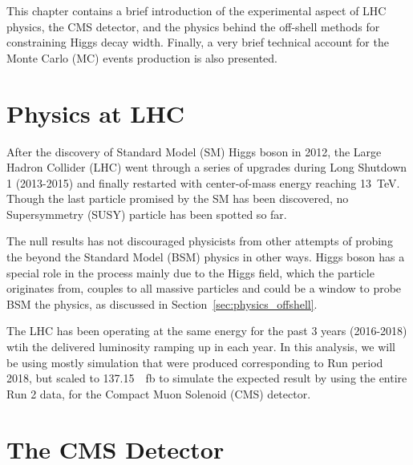 This chapter contains a brief introduction of the experimental aspect of
LHC physics, the CMS detector, and the physics behind the off-shell methods
for constraining Higgs decay width. Finally, a very brief technical account for
the Monte Carlo (MC) events production is also presented.

\section{Physics at LHC}
After the discovery of Standard Model (SM) Higgs boson in 2012, the Large Hadron Collider (LHC)
went through a series of upgrades during Long Shutdown 1 (2013-2015) and finally restarted with center-of-mass energy reaching
\SI{13}{\tera\electronvolt}. Though the last particle promised by the SM has been discovered,
no Supersymmetry (SUSY) particle has been spotted so far.

The null results has not discouraged physicists from other attempts of probing the 
beyond the Standard Model (BSM) physics in other ways. Higgs boson has a special role in
the process mainly due to the Higgs field, which the particle originates from, couples to all 
massive particles and could be a window to probe BSM the physics, 
as discussed in Section~\ref{sec:physics_offshell}.

The LHC has been operating at the same energy for the past 3 years (2016-2018) wtih 
the delivered luminosity ramping up in each year\cite{luminosity}. In this analysis, we will be using
mostly simulation that were produced corresponding to Run period 2018, but scaled to 
\SI{137.15}{\per\femto\barn} to simulate the expected result by using the entire Run 2 data,
for the Compact Muon Solenoid (CMS) detector.

\section{The CMS Detector}



